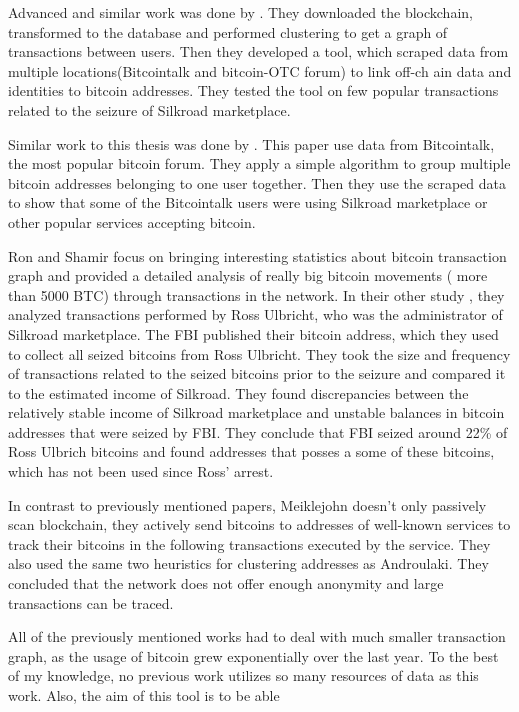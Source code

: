 \documentclass[
  digital, %
  table,   %
  lof,     %
  lot,     %
  oneside
]{fithesis3}
\begin{document}
Advanced and similar work was done by \parencite{spagnuolo2014bitiodine}. They downloaded the blockchain, transformed to
 the database
and performed clustering to get a graph of transactions between users.
Then they developed a tool, which scraped data from multiple locations(Bitcointalk and bitcoin-OTC forum) to link off-ch
ain data and identities to bitcoin addresses.
They tested the tool on few popular transactions related to the seizure of Silkroad marketplace.

Similar work to this thesis was done by \parencite{fleder2015bitcoin}.
This paper use data from Bitcointalk, the most popular bitcoin forum. 
They apply a simple algorithm to group multiple bitcoin addresses belonging to one user together.
Then they use the scraped data to show
that some of the Bitcointalk users were using Silkroad marketplace or other popular services accepting bitcoin.
 
Ron and Shamir \parencite{ron2013quantitative} focus on bringing
interesting statistics about bitcoin transaction graph
and provided a detailed analysis of really big bitcoin movements ( more than 5000 BTC) 
through transactions in the network.
In their other study \parencite{ron2014did}, they analyzed transactions performed by Ross Ulbricht,
who was the administrator of Silkroad marketplace.
The FBI published their bitcoin address, which they used to collect all seized bitcoins from Ross Ulbricht.
They took the size and frequency of transactions related to the seized bitcoins prior to the seizure and compared it to the estimated income of Silkroad. They found discrepancies between the
relatively stable income of Silkroad marketplace and unstable balances in bitcoin addresses
that were seized by FBI. They conclude that FBI seized around 22\% of Ross Ulbrich bitcoins
and found addresses that posses a some of these bitcoins, which has not been used since Ross' arrest.

In contrast to previously mentioned papers, Meiklejohn \parencite{meiklejohn2013fistful} 
doesn't only passively scan blockchain, they actively send bitcoins to addresses of
well-known services to track their bitcoins in the following transactions executed by the service.
They also used the same two heuristics for clustering addresses
as Androulaki. \parencite{androulaki2013evaluating}
They concluded that the network does not offer enough anonymity and large transactions can be traced.

All of the previously mentioned works had to deal with much smaller transaction graph, as the usage of bitcoin grew exponentially over the last year. 
To the best of my knowledge, no previous work utilizes so many resources of data as this work. Also, the aim of this tool is to be able
\end{document}
